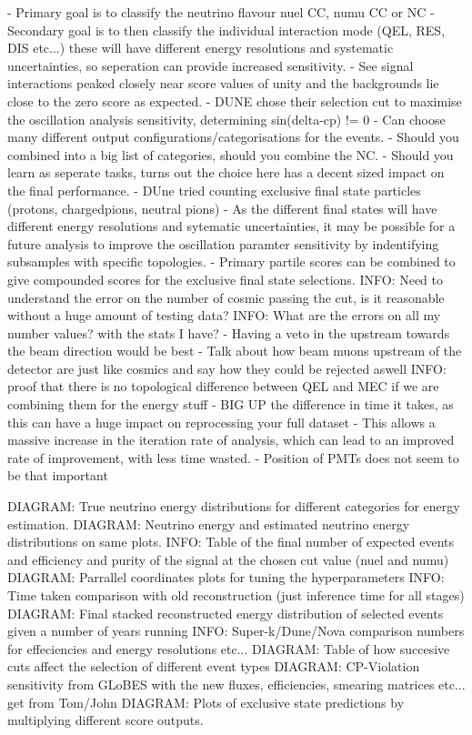 - Primary goal is to classify the neutrino flavour nuel CC, numu CC or NC
- Secondary goal is to then classify the individual interaction mode (QEL, RES, DIS etc...) these will have different energy resolutions and systematic uncertainties, so seperation can provide increased sensitivity.
- See signal interactions peaked closely near score values of unity and the backgrounds lie close to the zero score as expected.
- DUNE chose their selection cut to maximise the oscillation analysis sensitivity, determining sin(delta-cp) != 0
- Can choose many different output configurations/categorisations for the events.
- Should you combined into a big list of categories, should you combine the NC.
- Should you learn as seperate tasks, turns out the choice here has a decent sized impact on the final performance.
- DUne tried counting exclusive final state particles (protons, chargedpions, neutral pions)
- As the different final states will have different energy resolutions and sytematic uncertainties, it may be possible for a future analysis to improve the oscillation paramter sensitivity by indentifying subsamples with specific topologies.
- Primary partile scores can be combined to give compounded scores for the exclusive final state selections.
INFO: Need to understand the error on the number of cosmic passing the cut, is it reasonable without a huge amount of testing data?
INFO: What are the errors on all my number values? with the stats I have?
- Having a veto in the upstream towards the beam direction would be best
- Talk about how beam muons upstream of the detector are just like cosmics and say how they could be rejected aswell
INFO: proof that there is no topological difference between QEL and MEC if we are combining them for the energy stuff
- BIG UP the difference in time it takes, as this can have a huge impact on reprocessing your full dataset
- This allows a massive increase in the iteration rate of analysis, which can lead to an improved rate of improvement, with less time wasted.
- Position of PMTs does not seem to be that important

DIAGRAM: True neutrino energy distributions for different categories for energy estimation.
DIAGRAM: Neutrino energy and estimated neutrino energy distributions on same plots.
INFO: Table of the final number of expected events and efficiency and purity of the signal at the chosen cut value (nuel and numu)
DIAGRAM: Parrallel coordinates plots for tuning the hyperparameters
INFO: Time taken comparison with old reconstruction (just inference time for all stages)
DIAGRAM: Final stacked reconstructed energy distribution of selected events given a number of years running
INFO: Super-k/Dune/Nova comparison numbers for effeciencies and energy resolutions etc...
DIAGRAM: Table of how succesive cuts affect the selection of different event types
DIAGRAM: CP-Violation sensitivity from GLoBES with the new fluxes, efficiencies, smearing matrices etc... get from Tom/John
DIAGRAM: Plots of exclusive state predictions by multiplying different score outputs.

